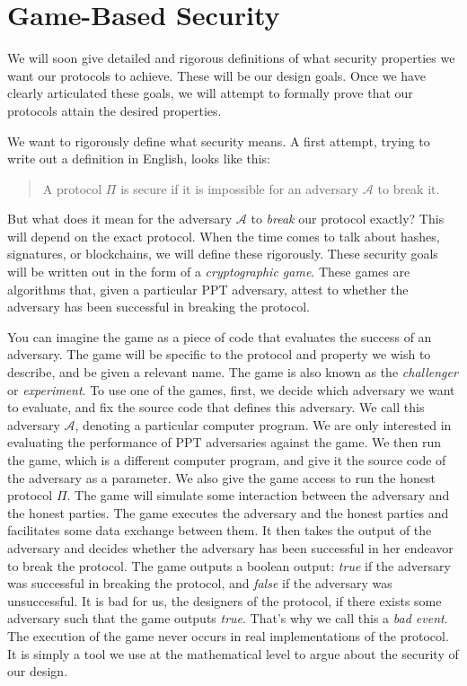 \section{Game-Based Security}

We will soon give detailed and rigorous definitions of what security properties we want
our protocols to achieve. These will be our design goals. Once we have clearly articulated
these goals, we will attempt to formally prove that our protocols attain the desired properties.

We want to rigorously define what security means. A first attempt, trying to write out a definition
in English, looks like this:

\begin{quote}
  A protocol $\Pi$ is secure if it is impossible for an adversary $\mathcal{A}$ to
  break it.
\end{quote}

But what does it mean for the adversary $\mathcal{A}$ to \emph{break} our protocol exactly?
This will depend on the exact protocol. When the time comes to talk about hashes, signatures,
or blockchains, we will define these rigorously.
These security goals will be written out in the form of a \emph{cryptographic game}. These
games are algorithms that, given a particular PPT adversary, attest to whether the adversary
has been successful in breaking the protocol.

You can imagine the game as a piece of code that evaluates the success of an adversary.
The game will be specific to the protocol and property we wish to describe, and be given
a relevant name. The game is also known as the \emph{challenger} or \emph{experiment}.
To use one of the games, first,
we decide which adversary we want to evaluate, and fix the source code that defines this adversary.
We call this adversary
$\mathcal{A}$,
denoting a particular computer program.
We are only interested in evaluating the performance of PPT adversaries against the game.
We then run the
game, which is a different computer program, and give it the source code of the adversary as a
parameter. We also give the game access to run the honest protocol
$\Pi$.
The game will
simulate some interaction between the adversary and the honest parties. The game executes
the adversary and the honest parties and facilitates some data exchange between them. It
then takes the output of the adversary and decides whether the adversary has been successful
in her endeavor to break the protocol. The game outputs a boolean output: \emph{true}
if the adversary was successful in breaking the protocol, and \emph{false} if the adversary
was unsuccessful. It is bad for us, the designers of the protocol, if there exists some
adversary such that the game outputs \emph{true}. That's why we call this a \emph{bad event}.
The execution of the game never occurs
in real implementations of the protocol. It is simply a tool we use at the mathematical
level to argue about the security of our design.

